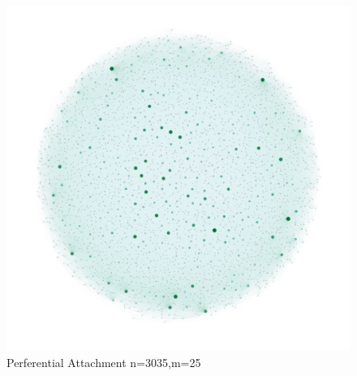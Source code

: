 \documentclass[runningheads]{llncs}
\begin{document}
\begin{figure}
\includegraphics[width=\textwidth]{4b_perferrential}
\caption{Perferential Attachment n=3035,m=25} \label{fig_4b_perferrential}
\end{figure}
\end{document}

